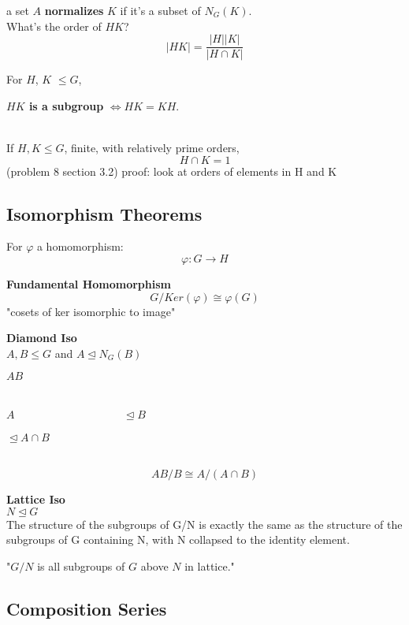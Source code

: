 \documentclass[12pt]{article}
\begin{document}
a set $A$ \textbf{normalizes} $K$ if it's a subset of $N_G(K)$.\\

What's the order of $HK$? \\
$$|HK| = \frac{|H||K|}{|H \cap K|}$$


For $H$, $K$ $\leq G$,\\
\centerline{ \textbf{$HK$ is a subgroup} $\iff HK = KH$.}
\ \\

If $H, K \leq G$, finite, with relatively prime orders, 
$$H \cap K = 1$$
\indent \textcolor[gray]{0.5}{(problem 8 section 3.2) proof: look at orders of elements in H and K}


\subsection*{Isomorphism Theorems}
For $\varphi$ a homomorphism: $$\varphi : G \rightarrow H$$

\noindent \textbf{Fundamental Homomorphism} \\
$$G / Ker(\varphi) \cong \varphi(G)$$
"cosets of ker isomorphic to image"

\noindent \textbf{Diamond Iso}\\
$A, B \leq G$ and $A \trianglelefteq N_G(B)$\\

\centerline{$AB$}\\
\> \> \> \> \> \> \>\> \> \> \> \> \> \> \> \> \> \> \> \> \> \> \> \> \> \> \> \> \> \> \> \> \> \> \> \> \> \> \> \> \> \> \> \> \> \> \> \> \>  $A$ \ \ \ \ \ \ \ \ \ \ \ \ \ \ \ \ \ \ \ $\trianglelefteq B$\\
\centerline{$\trianglelefteq A \cap B$}\\

$$AB / B \cong A / (A \cap B)$$

\noindent \textbf{Lattice Iso}\\
$N \trianglelefteq G$ \\

The structure of the subgroups of G/N is exactly the same as the structure of the subgroups of G containing N, with N collapsed to the identity element.

"$G/N$ is all subgroups of $G$ above $N$ in lattice."

\subsection*{Composition Series}
\end{document}
